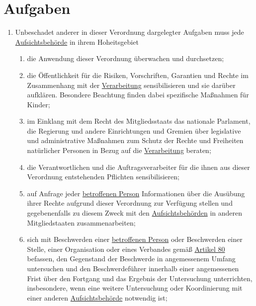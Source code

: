 \chapter{Aufgaben}
\label{ch:57}


\begin{enumerate}

  \item Unbeschadet anderer in dieser Verordnung dargelegter Aufgaben muss jede \hyperref[itm:04-21]{Aufsichtsbehörde} in ihrem Hoheitsgebiet
\label{itm:57-1}

  \begin{enumerate}
  
    \item die Anwendung dieser Verordnung überwachen und durchsetzen;
    \label{itm:57-1a}

    \item die Öffentlichkeit für die Risiken, Vorschriften, Garantien und Rechte im Zusammenhang mit der \hyperref[itm:04-2]{Verarbeitung}
     sensibilisieren und sie darüber aufklären. Besondere Beachtung finden dabei spezifische Maßnahmen für Kinder;
    \label{itm:57-1b}

    \item im Einklang mit dem Recht des Mitgliedsstaats das nationale Parlament, die Regierung und andere Einrichtungen
     und Gremien über legislative und administrative Maßnahmen zum Schutz der Rechte und Freiheiten natürlicher
     Personen in Bezug auf die \hyperref[itm:04-2]{Verarbeitung} beraten;
    \label{itm:57-1c}

    \item die Verantwortlichen und die Auftragsverarbeiter für die ihnen aus dieser Verordnung entstehenden Pflichten
     sensibilisieren;
    \label{itm:57-1d}

    \item auf Anfrage jeder \hyperref[itm:04-1]{betroffenen Person} Informationen über die Ausübung ihrer Rechte aufgrund dieser Verordnung
     zur Verfügung stellen und gegebenenfalls zu diesem Zweck mit den \hyperref[itm:04-21]{Aufsichtsbehörden} in anderen Mitgliedstaaten
     zusammenarbeiten;
    \label{itm:57-1e}

    \item sich mit Beschwerden einer \hyperref[itm:04-1]{betroffenen Person} oder Beschwerden einer Stelle, einer Organisation oder eines
     Verbandes gemäß \hyperref[ch:80]{Artikel 80} befassen, den Gegenstand der Beschwerde in angemessenem Umfang
     untersuchen und den Beschwerdeführer innerhalb einer angemessenen Frist über den Fortgang und das Ergebnis der
     Untersuchung unterrichten, insbesondere, wenn eine weitere Untersuchung oder Koordinierung mit einer anderen
     \hyperref[itm:04-21]{Aufsichtsbehörde} notwendig ist;
    \label{itm:57-1f}


\end{enumerate}
\end{enumerate}
